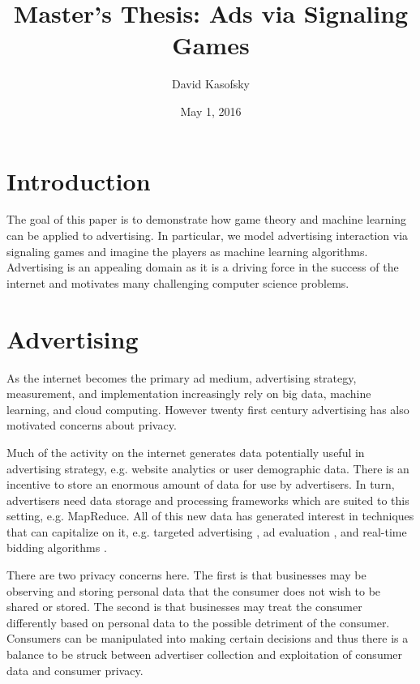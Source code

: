 \documentclass{article}
\title{Master's Thesis: Ads via Signaling Games}
\author{David Kasofsky}
\date{May 1, 2016}
\begin{document}
\maketitle

\newpage

\tableofcontents

\newpage

\section{Introduction}

The goal of this paper is to demonstrate how game theory and machine learning can be applied to advertising. In particular, we model advertising interaction via signaling games and imagine the players as machine learning algorithms. Advertising is an appealing domain as it is a driving force in the success of the internet and motivates many challenging computer science problems.

\section{Advertising}
As the internet becomes the primary ad medium\cite{iab1}, advertising strategy, measurement, and implementation increasingly rely on big data, machine learning, and cloud computing. However twenty first century advertising has also motivated concerns about privacy.

Much of the activity on the internet generates data potentially useful in advertising strategy, e.g. website analytics or user demographic data. There is an incentive to store an enormous amount of data for use by advertisers. In turn, advertisers need data storage and processing frameworks which are suited to this setting, e.g. MapReduce\cite{mapreduce1}. All of this new data has generated interest in techniques that can capitalize on it, e.g. targeted advertising \cite{displayadsml1}, ad evaluation \cite{abhishek2012media}, and real-time bidding algorithms \cite{yuan2014survey}.

There are two privacy concerns here. The first is that businesses may be observing and storing personal data that the consumer does not wish to be shared or stored. The second is that businesses may treat the consumer differently based on personal data to the possible detriment of the consumer. Consumers can be manipulated into making certain decisions \cite{akerlof2015phishing} and thus there is a balance to be struck between advertiser collection and exploitation of consumer data and consumer privacy.
\end{document}
